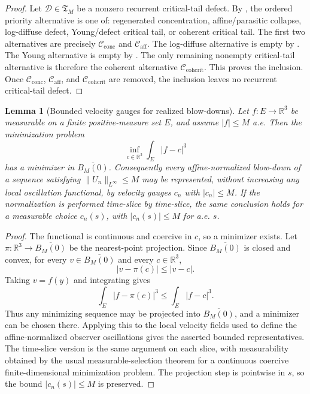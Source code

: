 \documentclass[11pt]{amsart}
\numberwithin{equation}{section}
\theoremstyle{plain}
\newtheorem{lemma}[lemma]{Lemma}
\theoremstyle{definition}
\theoremstyle{remark}
\newcommand{\Cactive}{\mathcal C_{\mathrm{conc}}}
\newcommand{\Caff}{\mathcal C_{\mathrm{aff}}}
\newcommand{\Ccohcrit}{\mathcal C_{\mathrm{cohcrit}}}
\newcommand{\Tcrit}{\mathfrak T_M}
\begin{document}
\begin{proof}
Let \(\mathcal D\in\Tcrit\) be a nonzero recurrent critical-tail defect.  By
, the ordered priority alternative is
one of: regenerated concentration, affine/parasitic collapse, log-diffuse defect,
Young/defect critical tail, or coherent critical tail.  The first two alternatives are
precisely \(\Cactive\) and \(\Caff\).  The log-diffuse alternative is empty by
.  The Young alternative is empty by
.  The only remaining nonempty critical-tail
alternative is therefore the coherent alternative \(\Ccohcrit\).  This proves the
inclusion.  Once \(\Cactive\), \(\Caff\), and \(\Ccohcrit\) are removed, the
inclusion leaves no recurrent critical-tail defect.
\end{proof}

\begin{lemma}[Bounded velocity gauges for realized blow-downs]
\label{lem:bounded-velocity-gauges-blowdown}
Let \(f:E\to\mathbb R^3\) be measurable on a finite positive-measure set
\(E\), and assume \(|f|\le M\) a.e.  Then the minimization problem
\[
   \inf_{c\in\mathbb R^3}\int_E |f-c|^3
\]
has a minimizer in \(\overline{B_M(0)}\).  Consequently every
affine-normalized blow-down of a sequence satisfying
\(\|U_n\|_{L^\infty}\le M\) may be represented, without increasing any local
oscillation functional, by velocity gauges \(c_n\) with \(|c_n|\le M\).  If the
normalization is performed time-slice by time-slice, the same conclusion holds
for a measurable choice \(c_n(s)\), with \(|c_n(s)|\le M\) for a.e. \(s\).
\end{lemma}

\begin{proof}
The functional is continuous and coercive in \(c\), so a minimizer exists.  Let
\(\pi:\mathbb R^3\to\overline{B_M(0)}\) be the nearest-point projection.  Since
\(\overline{B_M(0)}\) is closed and convex, for every \(v\in\overline{B_M(0)}\)
and every \(c\in\mathbb R^3\),
\[
   |v-\pi(c)|\le |v-c|.
\]
Taking \(v=f(y)\) and integrating gives
\[
   \int_E |f-\pi(c)|^3\le \int_E |f-c|^3 .
\]
Thus any minimizing sequence may be projected into \(\overline{B_M(0)}\), and a
minimizer can be chosen there.  Applying this to the local velocity fields used
to define the affine-normalized observer oscillations gives the asserted
bounded representatives.  The time-slice version is the same argument on each
slice, with measurability obtained by the usual measurable-selection theorem
for a continuous coercive finite-dimensional minimization problem.  The
projection step is pointwise in \(s\), so the bound \(|c_n(s)|\le M\) is
preserved.
\end{proof}
\end{document}
